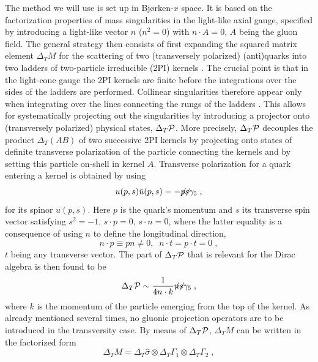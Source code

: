The method we will use is set up in Bj\o rken-$x$ space. It is based 
on the factorization properties of mass 
singularities in the light-like axial gauge, specified by introducing a 
light-like vector $n$ ($n^2=0$) with $n \cdot A=0$, $A$ being the gluon field.
The general strategy then consists of first expanding the squared 
matrix element $\Delta_T M$ for the scattering of two (transversely polarized)
(anti)quarks into two ladders of two-particle irreducible (2PI) 
kernels \cite{egmpr}. The crucial point is that in the light-cone 
gauge the 2PI kernels are finite before the integrations over the 
sides of the ladders are performed. Collinear singularities therefore 
appear only when integrating over the lines connecting the rungs of the 
ladders \cite{egmpr}. This allows for systematically projecting out 
the singularities by introducing a projector onto (transversely polarized) 
physical states, $\Delta_T {\cal P}$. More precisely, $\Delta_T {\cal P}$ decouples the product 
$\Delta_T (AB)$ of two successive 2PI kernels by projecting onto  
states of definite transverse polarization of the particle connecting the 
kernels and by setting this particle on-shell in kernel $A$. Transverse
polarization for a quark entering a kernel is obtained by using
\begin{equation} \label{g51}
u(p,s) \bar{u} (p,s) = - \slsh{p} \slsh{s} \gamma_5 \; ,
\end{equation}
for its spinor $u(p,s)$. Here $p$ is the quark's momentum and $s$ its 
transverse spin vector satisfying $s^2=-1$, $s \cdot p =0$, $s \cdot n=0$, 
where the latter equality is a consequence of using $n$ to define the  
longitudinal direction, 
\begin{equation}
n \cdot p \equiv pn \neq 0, \;\; n \cdot t=p \cdot t=0 \; , 
\end{equation}
$t$ being any transverse vector. The part of $\Delta_T {\cal P}$ that is relevant for 
the Dirac algebra is then found to be  
\begin{equation} \label{g52}
\Proj \sim \frac{1}{4 n \cdot k} \slsh{n} \slsh{s} \gamma_5 \; ,
\end{equation}
where $k$ is the momentum of the particle emerging from the top of the kernel.
As already mentioned several times, no gluonic projection operators
are to be introduced in the transversity case. 
By means of $\Delta_T {\cal P}$, $\Delta_T M$ can be written in the factorized form 
\begin{equation}
\Delta_T M = \Delta_T \hat{\sigma} \otimes \Delta_T \Gamma_1 \otimes 
\Delta_T \Gamma_2 \;,
\end{equation}
